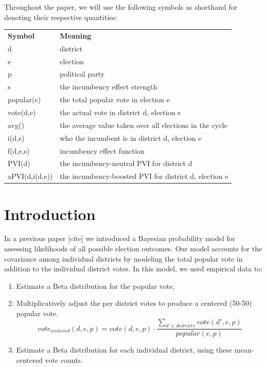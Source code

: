 \documentclass[preprint,12pt]{article}
\begin{document}
Throughout the paper, we will use the following symbols as shorthand for denoting their respective quantities:


\begin{tabular}{ll}
\textbf{Symbol} & \textbf{Meaning}                                        \\
d               & district                                                \\
e               & election                                                \\
p               & political party                                         \\
s               & the incumbency effect strength                          \\
popular(e)      & the total popular vote in election e                    \\
vote(d,e)       & the actual vote in district d, election e                   \\
avg()           & the average value taken over all elections in the cycle \\
i(d,e)          & who the incumbent is in district d, election e          \\
f(d,e,s)               & incumbency effect function                              \\
PVI(d)          & the incumbency-neutral PVI for district d                                   \\
aPVI(d,i(d,e))       & the incumbency-boosted PVI for district d, election e   
\end{tabular}


\section{Introduction}

In a previous paper [cite] we introduced a Bayesian probability model for assessing likelihoods of all possible election outcomes.  Our model accounts for the covariance among individual districts by modeling the total popular vote in addition to the individual district votes.   In this model, we used empirical data to:
 
\begin{enumerate}
\item Estimate a Beta distribution for the popular vote,
\item Multiplicatively adjust the per district votes to produce a centered (50-50) popular vote.
\begin{equation}
vote_{centered}(d,e,p) = 
vote(d,e,p) \cdot \frac{ \sum_{d' \in districts}{vote(d',e,p)}}{popular(e,p) } 
\end{equation}

\item Estimate a Beta distribution for each individual district, using these mean-centered vote counts.
\end{enumerate}
\end{document}

